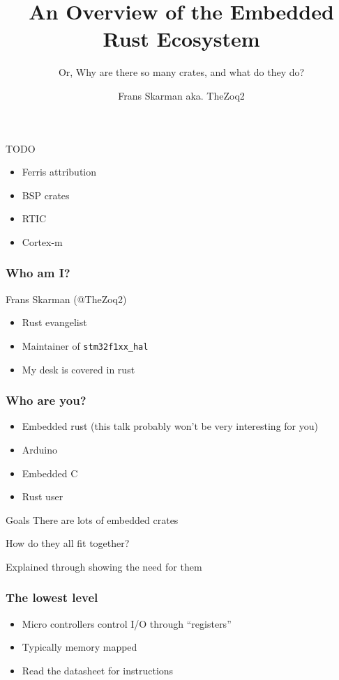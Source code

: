 \documentclass[169]{beamer}
\title{An Overview of the Embedded Rust Ecosystem}
\subtitle{Or, Why are there so many crates, and what do they do?}
\author{Frans Skarman aka. TheZoq2}
\begin{document}
\maketitle

\begin{frame}{TODO}
    \begin{itemize}
        \item Ferris attribution
        \item BSP crates
        \item RTIC
        \item Cortex-m
    \end{itemize}
\end{frame}

\begin{frame}
    \frametitle{Who am I?}
    
    Frans Skarman (@TheZoq2)

    \begin{itemize}
        \item Rust evangelist
        \item Maintainer of \texttt{stm32f1xx\_hal}
        \item My desk is covered in rust
    \end{itemize}
\end{frame}

\begin{frame}
    \frametitle{Who are you?}

    \begin{itemize}
        \item Embedded rust (this talk probably won't be very interesting for you)
        \item Arduino
        \item Embedded C
        \item Rust user
    \end{itemize}
\end{frame}

\begin{frame}{Goals}
    There are lots of embedded crates

    How do they all fit together?

    Explained through showing the need for them
\end{frame}

\begin{frame}
    \frametitle{The lowest level}

    \begin{itemize}
        \item Micro controllers control I/O through ``registers''
        \item Typically memory mapped
        \item Read the datasheet for instructions
    \end{itemize}
\end{frame}
\end{document}
